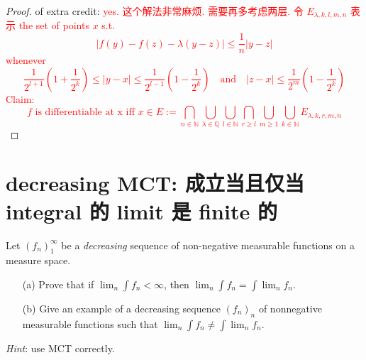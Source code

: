 \documentclass[lang=cn,11pt]{elegantbook}
\begin{document}
\begin{proof}
    of extra credit: \textcolor{red}{yes. 这个解法非常麻烦. 需要再多考虑两层. 
令 $E_{\lambda, k,l,m,n}$ 表示 the set of points $x$ s.t. \[
|f(y) - f(z) - \lambda (y-z) | \leq \frac{1}{n} |y-z|
\]
whenever \[
\frac{1}{2^{l+1}} (1 +\frac{1}{2^k}) \leq |y-x| \leq  \frac{1}{2^{l-1}} (1 -\frac{1}{2^k})  \quad \text{and} \quad |z-x| \leq \frac{1}{2^m} (1 -\frac{1}{2^k}) 
\]
Claim: \[
 f  \text{ is differentiable at x} \text{ iff }     x \in E:= \bigcap_{n\in\mathbb{N}} \bigcup_{\lambda \in\mathbb{Q}} \bigcup_{l \in \mathbb{N}} \bigcap_{r \geq l} \bigcup_{m\geq 1} \bigcup_{k \in \mathbb{N}}    E_{\lambda, k,r,m,n}
\]
}
\end{proof}

  
\section{decreasing MCT: 成立当且仅当 integral 的 limit 是 finite 的}
  Let $(f_n)_1^\infty$ be a \emph{decreasing} sequence of non-negative measurable functions on a measure space. 
  \begin{itemize}
  \item[(a)]  Prove that if $\lim_n\int f_n<\infty$, then $\lim_n\int f_n=\int\lim_nf_n$. 
  \item[(b)]Give an example of a decreasing sequence $(f_n)_n$ of nonnegative measurable functions such that $\lim_n\int f_n\ne\int\lim_nf_n$. 
  \end{itemize}
  \textit{Hint}: use MCT correctly. 
\end{document}
